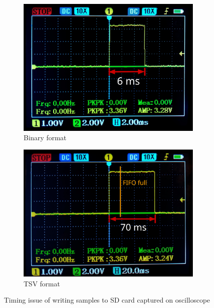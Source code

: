 \begin{figure}[h]
    \centering
    \begin{subfigure}[b]{0.49\textwidth}
        \includegraphics[width=\textwidth]{assets/design/oscilloscope/bin-fomat.jpg}
        \caption{Binary format}
        \label{fig:implementation:binary-format}
    \end{subfigure}
    \hfill
    \begin{subfigure}[b]{0.49\textwidth}
        \includegraphics[width=\textwidth]{assets/design/oscilloscope/tsv-format.jpg}
        \caption{TSV format}
        \label{fig:implementation:tsv-format}
    \end{subfigure}
    \caption{Timing issue of writing samples to SD card captured on oscilloscope}
\end{figure}


